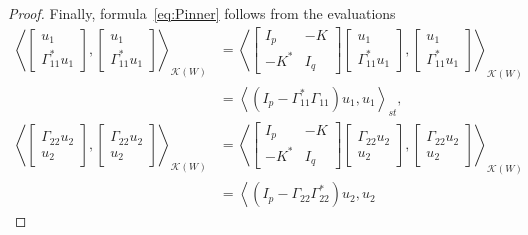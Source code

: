 \documentclass[12pt,twoside,a4paper]{amsart}
\theoremstyle{definition}
\numberwithin{equation}{section}
\begin{document}
\begin{proof}
Finally, formula~\eqref{eq:Pinner} follows from the evaluations
\begin{equation}
\label{eq:jun5a9}
\begin{split}
    \left\langle \begin{bmatrix}u_1\\ \Gamma_{11}^*u_1\end{bmatrix},
    \begin{bmatrix}u_1\\ \Gamma_{11}^*u_1\end{bmatrix}
    \right\rangle_{{{\mathcal K}}(W)}
    &=\left\langle \begin{bmatrix}I_p & -K\\ -K^* & I_q\end{bmatrix}
    \begin{bmatrix}u_1\\ \Gamma_{11}^*u_1\end{bmatrix},
    \begin{bmatrix}u_1\\ \Gamma_{11}^*u_1\end{bmatrix}
    \right\rangle_{{{\mathcal K}}(W)}\\
    &=\left\langle (I_p-\Gamma_{11}^*\Gamma_{11})u_1,u_1
    \right\rangle_{st},
    \end{split}
\end{equation}
\begin{equation}
\label{eq:jun5b9}
\begin{split}
    \left\langle \begin{bmatrix}\Gamma_{22}u_2\\ u_2
\end{bmatrix},
    \begin{bmatrix}\Gamma_{22}u_2\\ u_2
\end{bmatrix}
    \right\rangle_{{{\mathcal K}}(W)}
    &=\left\langle \begin{bmatrix}I_p & -K\\ -K^* & I_q\end{bmatrix}
    \begin{bmatrix}\Gamma_{22}u_2\\ u_2
\end{bmatrix},
   \begin{bmatrix}\Gamma_{22}u_2\\ u_2
\end{bmatrix}
    \right\rangle_{{{\mathcal K}}(W)}\\
    &=\left\langle (I_p-\Gamma_{22}\Gamma_{22}^*)u_2,u_2

\end{split}
\end{equation}
\end{proof}
\end{document}

